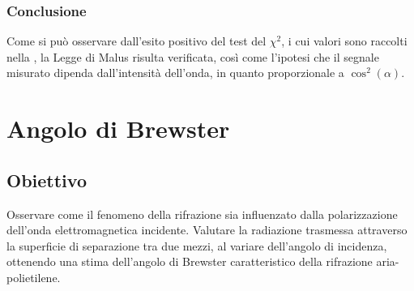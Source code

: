 \documentclass[a4paper]{article}
\begin{document}
\subsubsection{Conclusione}
Come si può osservare dall'esito positivo del test del $\chi^2$, i cui valori sono raccolti nella , la Legge di Malus risulta verificata, così come l'ipotesi che il segnale misurato dipenda dall'intensità dell'onda, in quanto proporzionale a $\cos^2(\alpha)$.



\section{Angolo di Brewster}
\subsection{Obiettivo}
Osservare come il fenomeno della rifrazione sia influenzato dalla polarizzazione dell'onda elettromagnetica incidente. Valutare la radiazione trasmessa attraverso la superficie di separazione tra due mezzi, al variare dell'angolo di incidenza, ottenendo una stima dell'angolo di Brewster caratteristico della rifrazione aria-polietilene. 
\end{document}
